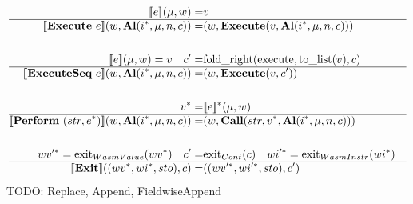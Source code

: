 \begin{align*}
%
\newline \\
  \sem{e}(\mu, w) =& v \\
  \hline
  \sem{\textbf{Execute} ~ e}(w, \al (\seq{i}, \mu, n, c))
  =&
  (w, \exe (v, \al (\seq{i}, \mu, n, c))) \\
%
\newline \\
  \sem{e}(\mu, w) = v \quad
  c' =& \text{fold\_right}(\text{execute}, \text{to\_list}(v), c) \\
  \hline
  \sem{\textbf{ExecuteSeq} ~ e}(w, \al (\seq{i}, \mu, n, c))
  =&
  (w, \exe (v, c')) \\
%
\newline \\
  \seq v =& \seq{\sem{e}}(\mu, w) \\
  \hline
  \sem{\textbf{Perform} ~ (str, \seq e)}(w, \al (\seq{i}, \mu, n, c))
  =&
  (w, \call (str, \seq v, \al (\seq{i}, \mu, n, c))) \\
%
\newline \\
  \seq{wv'} = \text{exit}_{WasmValue}(\seq{wv}) \quad
  c' =& \text{exit}_{Cont}(c) \quad
  \seq{wi'} = \text{exit}_{WasmInstr}(\seq{wi}) \\
  \hline
  \sem{\textbf{Exit}}((\seq{wv}, \seq{wi}, sto), c)
  =&
  ((\seq{wv'}, \seq{wi'}, sto), c') \\
\end{align*}
TODO: Replace, Append, FieldwiseAppend

